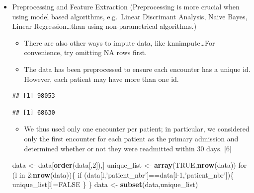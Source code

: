 \documentclass[]{article}
\newenvironment{Shaded}{\begin{snugshade}}{\end{snugshade}}
\newcommand{\KeywordTok}[1]{\textcolor[rgb]{0.13,0.29,0.53}{\textbf{{#1}}}}
\newcommand{\DecValTok}[1]{\textcolor[rgb]{0.00,0.00,0.81}{{#1}}}
\newcommand{\StringTok}[1]{\textcolor[rgb]{0.31,0.60,0.02}{{#1}}}
\newcommand{\OtherTok}[1]{\textcolor[rgb]{0.56,0.35,0.01}{{#1}}}
\newcommand{\NormalTok}[1]{{#1}}
\begin{document}
\begin{itemize}
\item
  Preprocessing and Feature Extraction (Preprocessing is more crucial
  when using model based algorithms, e.g.~Linear Discrimant Analysis,
  Naive Bayes, Linear Regression\ldots{}than using non-parametrical
  algorithms.)

  \begin{itemize}
  \itemsep1pt\parskip0pt
  \item
    There are also other ways to impute data, like knnimpute\ldots{}For
    convenience, try omitting NA rows first.
  \item
    The data has been preprocessed to ensure each encounter has a unique
    id. However, each patient may have more than one id.
  \end{itemize}

\begin{Shaded}
\end{Shaded}

\begin{verbatim}
## [1] 98053
\end{verbatim}

\begin{Shaded}
\end{Shaded}

\begin{verbatim}
## [1] 68630
\end{verbatim}

  \begin{itemize}
  \itemsep1pt\parskip0pt
  \item
    We thus used only one encounter per patient; in particular, we
    considered only the first encounter for each patient as the primary
    admission and determined whether or not they were readmitted within
    30 days. {[}6{]}
  \end{itemize}

\begin{Shaded}
\begin{Highlighting}[]
\NormalTok{data <-}\StringTok{ }\NormalTok{data[}\KeywordTok{order}\NormalTok{(data[,}\DecValTok{2}\NormalTok{]),]}
\NormalTok{unique_list <-}\StringTok{ }\KeywordTok{array}\NormalTok{(}\OtherTok{TRUE}\NormalTok{,}\KeywordTok{nrow}\NormalTok{(data))}
\NormalTok{for (l in }\DecValTok{2}\NormalTok{:}\KeywordTok{nrow}\NormalTok{(data))\{}
    \NormalTok{if (data[l,}\StringTok{'patient_nbr'}\NormalTok{]==data[l}\DecValTok{-1}\NormalTok{,}\StringTok{'patient_nbr'}\NormalTok{])\{}
        \NormalTok{unique_list[l]=}\OtherTok{FALSE}
    \NormalTok{\}}
\NormalTok{\}}
\NormalTok{data <-}\StringTok{ }\KeywordTok{subset}\NormalTok{(data,unique_list)}
\end{Highlighting}
\end{Shaded}


\end{itemize}
\end{document}
